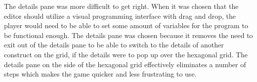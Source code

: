 The details pane was more difficult to get right. When it was chosen that the editor should utilize a visual programming interface with drag and drop, the player would need to be able to set some amount of variables for the program to be functional enough. The details pane was chosen because it removes the need to exit out of the details pane to be able to switch to the details of another construct on the grid, if the details were to pop up over the hexagonal grid. The details pane on the side of the hexagonal grid effectively eliminates a number of steps which makes the game quicker and less frustrating to use.
